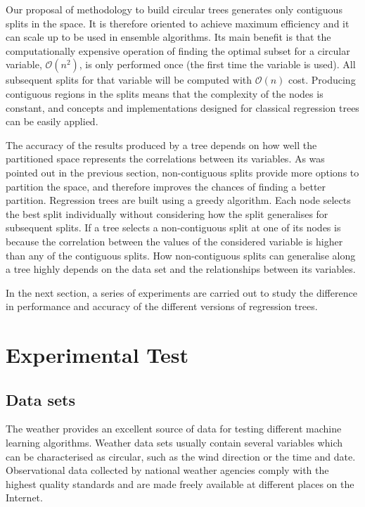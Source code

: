 \documentclass[times,twocolumn,final,authoryear]{elsarticle}
\begin{document}
Our proposal of methodology to build circular trees generates only contiguous splits in the space. It is therefore oriented to achieve maximum efficiency and it can scale up to be used in ensemble algorithms. Its main benefit is that the computationally expensive operation of finding the optimal subset for a circular variable, $\mathcal{O}(n^2)$, is only performed once (the first time the variable is used). All subsequent splits for that variable will be computed with $\mathcal{O}(n)$ cost. Producing contiguous regions in the splits means that the complexity of the nodes is constant, and concepts and implementations designed for classical regression trees can be easily applied.

The accuracy of the results produced by a tree depends on how well the partitioned space represents the correlations between its variables. As was pointed out in the previous section, non-contiguous splits provide more options to partition the space, and therefore improves the chances of finding a better partition. Regression trees are built using a greedy algorithm. Each node selects the best split individually without considering how the split generalises for subsequent splits. If a tree selects a non-contiguous split at one of its nodes is because the correlation between the values of the considered variable is higher than any of the contiguous splits. How non-contiguous splits can generalise along a tree highly depends on the data set and the relationships between its variables.

In the next section, a series of experiments are carried out to study the difference in performance and accuracy of the different versions of regression trees.


\section{Experimental Test}

\subsection{Data sets}

The weather provides an excellent source of data for testing different machine learning algorithms. Weather data sets usually contain several variables which can be characterised as circular, such as the wind direction or the time and date. Observational data collected by national weather agencies comply with the highest quality standards and are made freely available at different places on the Internet.
\end{document}
